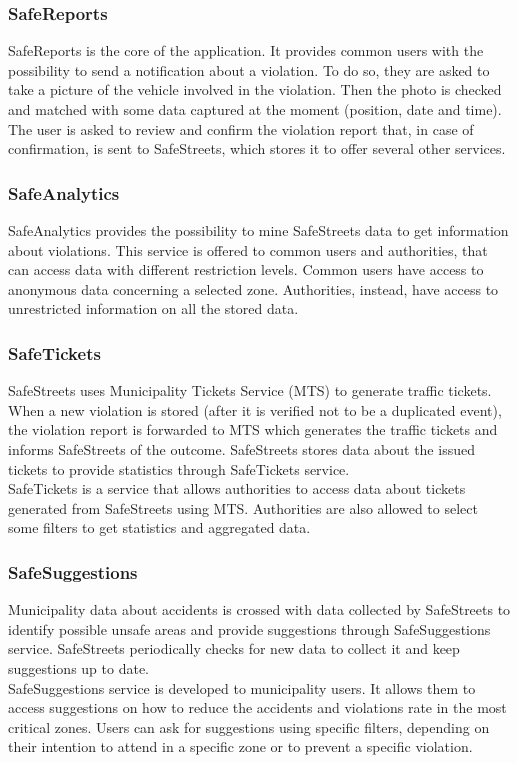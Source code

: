 \documentclass[./main.tex]{subfiles}
\begin{document}
\subsubsection{SafeReports}

SafeReports is the core of the application. It provides common users
with the possibility to send a notification about a violation. To do so,
they are asked to take a picture of the vehicle involved in the
violation. Then the photo is checked and matched with some data captured
at the moment (position, date and time). The user is asked to review and
confirm the violation report that, in case of confirmation, is sent to
SafeStreets, which stores it to offer several other services.

\subsubsection{SafeAnalytics}

SafeAnalytics provides the possibility to mine SafeStreets data to get
information about violations. This service is offered to common users
and authorities, that can access data with different restriction levels.
Common users have access to anonymous data concerning a selected zone.
Authorities, instead, have access to unrestricted information on all the
stored data.

\subsubsection{SafeTickets}

SafeStreets uses Municipality Tickets Service (MTS) to generate traffic
tickets. When a new violation is stored (after it is verified not to be
a duplicated event), the violation report is forwarded to MTS which
generates the traffic tickets and informs SafeStreets of the outcome.
SafeStreets stores data about the issued tickets to provide statistics
through SafeTickets service.\\
SafeTickets is a service that allows authorities to access data about
tickets generated from SafeStreets using MTS. Authorities are also
allowed to select some filters to get statistics and aggregated data.

\subsubsection{SafeSuggestions}

Municipality data about accidents is crossed with data collected by
SafeStreets to identify possible unsafe areas and provide suggestions
through SafeSuggestions service. SafeStreets periodically checks for new
data to collect it and keep suggestions up to date.\\
SafeSuggestions service is developed to municipality users. It allows
them to access suggestions on how to reduce the accidents and violations
rate in the most critical zones. Users can ask for suggestions using
specific filters, depending on their intention to attend in a specific
zone or to prevent a specific violation.
\end{document}
